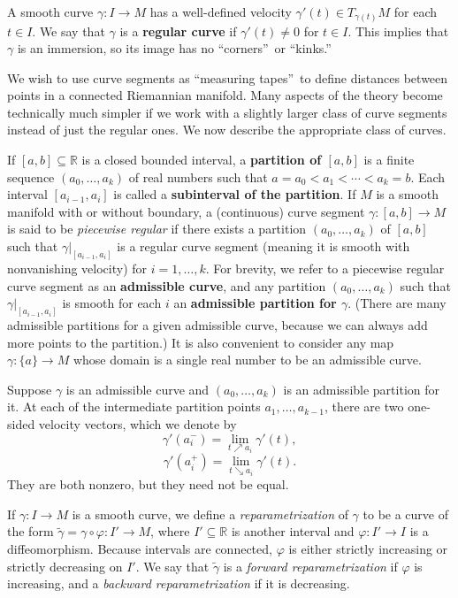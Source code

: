 A smooth curve $\gamma: I \to M$ has a well-defined velocity $\gamma'(t) \in T_{\gamma(t)} M$ for each $t \in I$. We say that $\gamma$ is a \textbf{regular curve} if $\gamma'(t) \neq 0$ for $t \in I$. This implies that $\gamma$ is an immersion, so its image has no \textquotedblleft corners\textquotedblright\ or \textquotedblleft kinks.\textquotedblright

We wish to use curve segments as \textquotedblleft measuring tapes\textquotedblright\ to define distances between points in a connected Riemannian manifold. Many aspects of the theory become technically much simpler if we work with a slightly larger class of curve segments instead of just the regular ones. We now describe the appropriate class of curves.

If $[a, b] \subseteq \mathbb{R}$ is a closed bounded interval, a \textbf{partition of $[a,b]$} is a finite sequence $(a_0, \ldots, a_k)$ of real numbers such that $a = a_0 < a_1 < \cdots < a_k = b$. Each interval $[a_{i-1}, a_i]$ is called a \textbf{subinterval of the partition}. If $M$ is a smooth manifold with or without boundary, a (continuous) curve segment $\gamma: [a, b] \to M$ is said to be
\emph{piecewise regular} if there exists a partition $(a_0,\ldots,a_k)$ of $[a,b]$ such that $\gamma|_{[a_{i-1},a_i]}$ is a regular curve segment (meaning it is smooth with nonvanishing velocity) for $i=1,\ldots,k$. For brevity, we refer to a piecewise regular curve segment as an \textbf{admissible curve}, and any partition $(a_0,\ldots,a_k)$ such that $\gamma|_{[a_{i-1},a_i]}$ is smooth for each $i$ an \textbf{admissible partition for $\gamma$}. (There are many admissible partitions for a given admissible curve, because we can always add more points to the partition.) It is also convenient to consider any map $\gamma: \{a\} \to M$ whose domain is a single real number to be an admissible curve.

Suppose $\gamma$ is an admissible curve and $(a_0,\ldots,a_k)$ is an admissible partition for it. At each of the intermediate partition points $a_1,\ldots,a_{k-1}$, there are two one-sided velocity vectors, which we denote by
\[
\gamma'(a_i^-) = \lim_{t \nearrow a_i} \gamma'(t),
\]
\[
\gamma'(a_i^+) = \lim_{t \searrow a_i} \gamma'(t).
\]
They are both nonzero, but they need not be equal.

If $\gamma: I \to M$ is a smooth curve, we define a \emph{reparametrization} of $\gamma$ to be a curve of the form $\tilde{\gamma} = \gamma \circ \varphi: I' \to M$, where $I' \subseteq \mathbb{R}$ is another interval and $\varphi: I' \to I$ is a diffeomorphism. Because intervals are connected, $\varphi$ is either strictly increasing or strictly decreasing on $I'$. We say that $\tilde{\gamma}$ is a \emph{forward reparametrization} if $\varphi$ is increasing, and a \emph{backward reparametrization} if it is decreasing.

